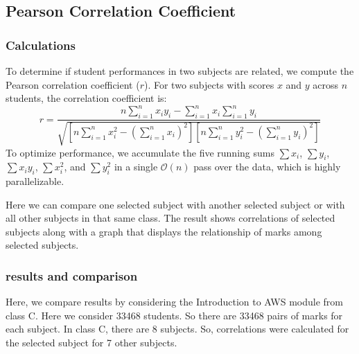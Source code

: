 \documentclass[12pt,a4paper]{article}
\begin{document}
\clearpage

\subsection{Pearson Correlation Coefficient}

\subsubsection{Calculations}
To determine if student performances in two subjects are related, we compute the Pearson correlation coefficient ($r$). For two subjects with scores $x$ and $y$ across $n$ students, the correlation coefficient is:
\begin{equation}
    r = \frac{n \sum_{i=1}^{n} x_i y_i - \sum_{i=1}^{n} x_i \sum_{i=1}^{n} y_i}{\sqrt{\left[ n \sum_{i=1}^{n} x_i^2 - \left(\sum_{i=1}^{n} x_i\right)^2 \right] \left[ n \sum_{i=1}^{n} y_i^2 - \left(\sum_{i=1}^{n} y_i\right)^2 \right]}}
\end{equation}
To optimize performance, we accumulate the five running sums $\sum x_i$, $\sum y_i$, $\sum x_i y_i$, $\sum x_i^2$, and $\sum y_i^2$ in a single $\mathcal{O}(n)$ pass over the data, which is highly parallelizable.

Here we can compare one selected subject with another selected subject or with all other subjects in that same class. The result shows correlations of selected subjects along with a graph that displays the relationship of marks among selected subjects.

\subsubsection{results and comparison}
Here, we compare results by considering the Introduction to AWS module from class C. Here we consider 33468 students. So there are 33468 pairs of marks for each subject. In class C, there are 8 subjects. So, correlations were calculated for the selected subject for 7 other subjects.
\end{document}
